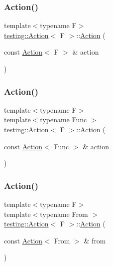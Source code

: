 \subsubsection{\texorpdfstring{Action()}{Action()}\hspace{0.1cm}{\footnotesize\ttfamily [3/5]}}
{\footnotesize\ttfamily template$<$typename F$>$ \\
\hyperlink{classtesting_1_1_action}{testing\+::\+Action}$<$ F $>$\+::\hyperlink{classtesting_1_1_action}{Action} (\begin{DoxyParamCaption}\item[{const \hyperlink{classtesting_1_1_action}{Action}$<$ F $>$ \&}]{action }\end{DoxyParamCaption})\hspace{0.3cm}{\ttfamily [inline]}}

\mbox{\label{classtesting_1_1_action_a806bacddaa1f1daf61f89674564bdf0f}} 
\subsubsection{\texorpdfstring{Action()}{Action()}\hspace{0.1cm}{\footnotesize\ttfamily [4/5]}}
{\footnotesize\ttfamily template$<$typename F$>$ \\
template$<$typename Func $>$ \\
\hyperlink{classtesting_1_1_action}{testing\+::\+Action}$<$ F $>$\+::\hyperlink{classtesting_1_1_action}{Action} (\begin{DoxyParamCaption}\item[{const \hyperlink{classtesting_1_1_action}{Action}$<$ Func $>$ \&}]{action }\end{DoxyParamCaption})\hspace{0.3cm}{\ttfamily [explicit]}}

\mbox{\label{classtesting_1_1_action_af23eef2fff5a92d8ff2ed7ac7a542005}} 
\subsubsection{\texorpdfstring{Action()}{Action()}\hspace{0.1cm}{\footnotesize\ttfamily [5/5]}}
{\footnotesize\ttfamily template$<$typename F$>$ \\
template$<$typename From $>$ \\
\hyperlink{classtesting_1_1_action}{testing\+::\+Action}$<$ F $>$\+::\hyperlink{classtesting_1_1_action}{Action} (\begin{DoxyParamCaption}\item[{const \hyperlink{classtesting_1_1_action}{Action}$<$ From $>$ \&}]{from }\end{DoxyParamCaption})}



